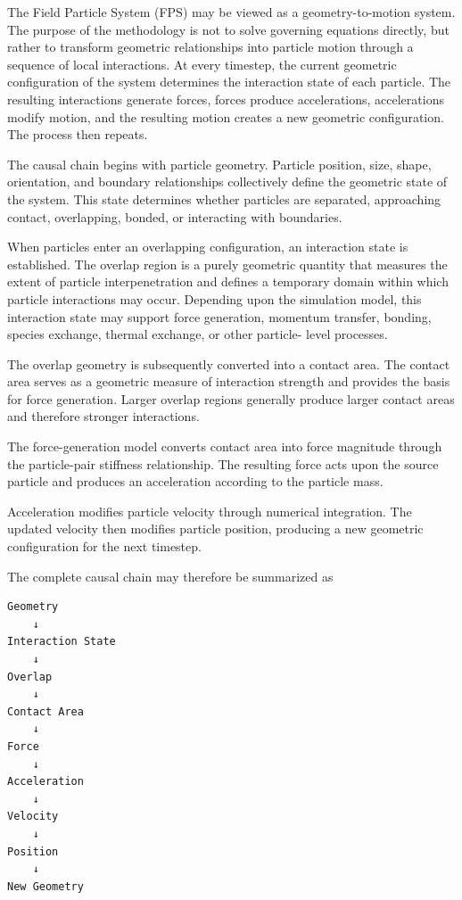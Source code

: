 The Field Particle System (FPS) may be viewed as a
geometry-to-motion system. The purpose of the methodology
is not to solve governing equations directly, but rather
to transform geometric relationships into particle motion
through a sequence of local interactions. At every
timestep, the current geometric configuration of the
system determines the interaction state of each particle.
The resulting interactions generate forces, forces produce
accelerations, accelerations modify motion, and the
resulting motion creates a new geometric configuration.
The process then repeats.

The causal chain begins with particle geometry. Particle
position, size, shape, orientation, and boundary
relationships collectively define the geometric state of
the system. This state determines whether particles are
separated, approaching contact, overlapping, bonded, or
interacting with boundaries.

When particles enter an overlapping configuration, an
interaction state is established. The overlap region is a
purely geometric quantity that measures the extent of
particle interpenetration and defines a temporary domain
within which particle interactions may occur. Depending
upon the simulation model, this interaction state may
support force generation, momentum transfer, bonding,
species exchange, thermal exchange, or other particle-
level processes.

The overlap geometry is subsequently converted into a
contact area. The contact area serves as a geometric
measure of interaction strength and provides the basis for
force generation. Larger overlap regions generally produce
larger contact areas and therefore stronger interactions.

The force-generation model converts contact area into
force magnitude through the particle-pair stiffness
relationship. The resulting force acts upon the source
particle and produces an acceleration according to the
particle mass.

Acceleration modifies particle velocity through numerical
integration. The updated velocity then modifies particle
position, producing a new geometric configuration for the
next timestep.

The complete causal chain may therefore be summarized as

\begin{verbatim}
Geometry
    ↓
Interaction State
    ↓
Overlap
    ↓
Contact Area
    ↓
Force
    ↓
Acceleration
    ↓
Velocity
    ↓
Position
    ↓
New Geometry
\end{verbatim}

